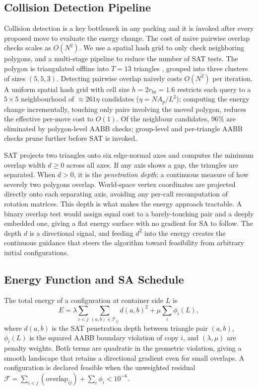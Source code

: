 \documentclass[10pt,twocolumn]{article}
\begin{document}
\subsection{Collision Detection Pipeline}

Collision detection is a key bottleneck in any packing and it is 
invoked after every proposed move to evaluate the energy change.
The cost of naive pairwise overlap checks scales as $O(N^2)$.
We use a spatial hash grid to only check neighboring polygons, and a
multi-stage pipeline to reduce the number of SAT tests.
 The polygon is triangulated offline into
$T=13$ triangles , grouped into three clusters of
sizes $(5,5,3)$. Detecting pairwise overlap naively costs $O(N^2)$
per iteration. A uniform spatial hash grid with cell size $h =
2r_{\mathrm{br}} = 1.6$ restricts each query to a $5\times 5$
neighbourhood of $\approx 261\eta$ candidates ($\eta = NA_p/L^2$);
computing the energy change incrementally, touching only pairs
involving the moved polygon, reduces the effective per-move cost to
$O(1)$. Of the neighbour candidates, 96\% are eliminated by
polygon-level AABB checks; group-level and per-triangle AABB checks
prune further before SAT is invoked.

SAT projects two triangles onto six edge-normal axes and computes the
minimum overlap width $d \geq 0$ across all axes. If any axis shows a
gap, the triangles are separated. When $d > 0$, it is the
\emph{penetration depth}: a continuous measure of how severely two
polygons overlap. World-space vertex coordinates are projected directly
onto each separating axis, avoiding any per-call recomputation of
rotation matrices. This depth is what makes the energy approach
tractable. A binary overlap test would assign equal cost to a
barely-touching pair and a deeply embedded one, giving a flat energy
surface with no gradient for SA to follow. The depth $d$ is a
directional signal, and feeding $d^{2}$ into the energy creates the
continuous guidance that steers the algorithm toward feasibility from
arbitrary initial configurations.

\subsection{Energy Function and SA Schedule}

The total energy of a configuration at container side $L$ is
\begin{equation}
  E = \lambda \!\sum_{i<j}\sum_{(a,b)\in\mathcal{T}_{ij}}
  d(a,b)^{2}
  + \mu \sum_i \phi_i(L),
  \label{eq:energy}
\end{equation}
where $d(a,b)$ is the SAT penetration depth between triangle pair
$(a,b)$, $\phi_i(L)$ is the squared AABB boundary violation of copy
$i$, and $(\lambda,\mu)$ are penalty weights.  Both terms are
quadratic in the geometric violation, giving a smooth landscape that
retains a directional gradient even for small overlaps. A
configuration is declared feasible when the unweighted residual
$\mathcal{F} = \sum_{i<j}(\text{overlap}_{ij}) + \sum_i\phi_i < 10^{-6}$.
\end{document}
